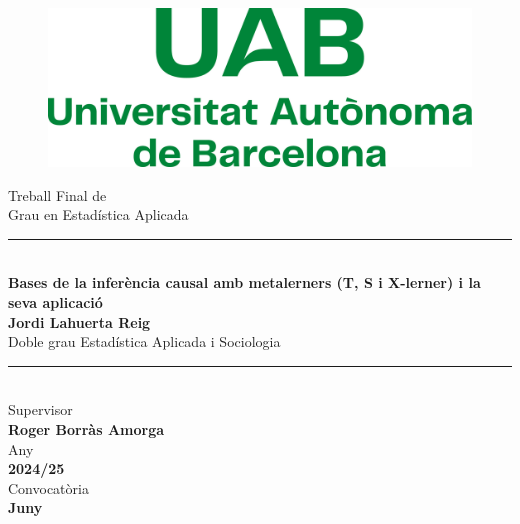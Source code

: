 \documentclass[/main.tex]{subfiles}
\begin{document}
	\begin{center}
	    \begin{figure}
	        \centering
	        \includegraphics[width=0.5\linewidth]{imgs/Logo_uab.png}
	    \end{figure} \mbox{} \par
		\vspace{1cm}
		{\Huge Treball Final de} \\ \bigskip
		{\LARGE Grau en Estadística Aplicada } \\
		\vfill
        \noindent\rule{\textwidth}{1pt} \\ \bigskip
		{\Huge \bfseries Bases de la inferència causal amb metalerners (T, S i X-lerner) i la seva aplicació} \\
		\vspace{2cm}
		{\LARGE \textbf{Jordi Lahuerta Reig}} \\ 
        {Doble grau Estadística Aplicada i Sociologia} \\ \bigskip
	    \noindent\rule{\textwidth}{1pt} \\ 
	    \vfill
	    Supervisor \\ \textbf{Roger Borràs Amorga} \\ \medskip
		Any \\ \textbf{2024/25} \\ \medskip
		Convocatòria \\ \textbf{Juny}
	\end{center}
\end{document}
